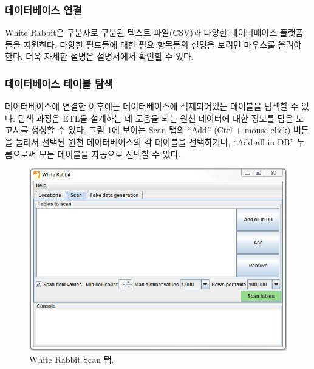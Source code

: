 \documentclass[11pt]{book}
\theoremstyle{definition}
\theoremstyle{definition}
\theoremstyle{definition}
\theoremstyle{remark}
\begin{document}
\subsubsection*{데이터베이스 연결}\label{-}

White Rabbit은 구분자로 구분된 텍스트 파일(CSV)과 다양한 데이터베이스
플랫폼들을 지원한다. 다양한 필드들에 대한 필요 항목들의 설명을 보려면
마우스를 올려야 한다. 더욱 자세한 설명은 설명서에서 확인할 수 있다.

\subsubsection*{데이터베이스 테이블 탐색}\label{--}

데이터베이스에 연결한 이후에는 데이터베이스에 적재되어있는 테이블을
탐색할 수 있다. 탐색 과정은 ETL을 설계하는 데 도움을 되는 원천 데이터에
대한 정보를 담은 보고서를 생성할 수 있다. 그림
\ref{fig:WhiteRabbitAddTables}에 보이는 Scan 탭의 ``Add'' (Ctrl + mouse
click) 버튼을 눌러서 선택된 원천 데이터베이스의 각 테이블을 선택하거나,
``Add all in DB'' 누름으로써 모든 테이블을 자동으로 선택할 수 있다.

\begin{figure}

{\centering \includegraphics[width=1\linewidth]{images/ExtractTransformLoad/WhiteRabbitAddTables} 

}

\caption{White Rabbit Scan 탭.}\label{fig:WhiteRabbitAddTables}
\end{figure}
\end{document}
